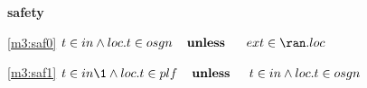 \textbf{safety}
\begin{block}
\item[ \eqref{m3:saf0} ]$t \in in \land loc.t \in osgn  \textbf{\quad unless \quad} \, ext \in \ran.loc  $ %
\item[ \eqref{m3:saf1} ]$t \in in  %
		\1\land loc.t \in plf  \textbf{\quad unless \quad} t \in in \land loc.t \in osgn $ %
\end{block}
